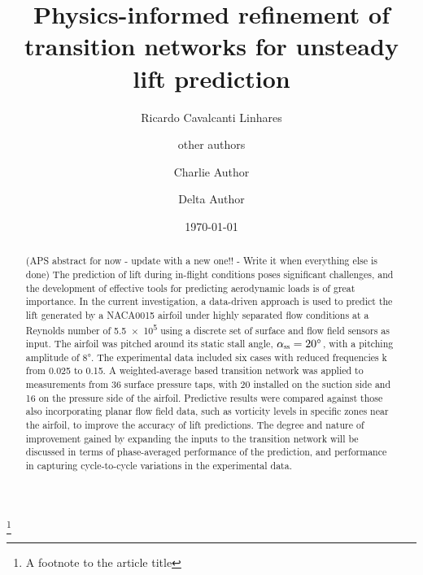 \documentclass[%
 reprint,
 amsmath,amssymb,
 aps,
]{revtex4-2}
\newcommand{\kindex}[2]{\ensuremath{{#1}_{\scalebox{0.65}{#2}}}}
\begin{document}

\title{Physics-informed refinement of transition networks for unsteady lift prediction}%
\thanks{A footnote to the article title}%

\author{Ricardo Cavalcanti Linhares}
\author{other authors}%
%


\author{Charlie Author}
%
%
\author{Delta Author}
%


\date{\today}%

\begin{abstract}
(APS abstract for now - update with a new one!! - Write it when everything else is done)
The prediction of lift during in-flight conditions poses significant challenges, and the development of effective tools for predicting aerodynamic loads is of great importance. 
In the current investigation, a data-driven approach is used to predict the lift generated by a NACA0015 airfoil under highly separated flow conditions at a Reynolds number of \num{5.5e5} using a discrete set of surface and flow field sensors as input. 
The airfoil was pitched around its static stall angle,  $\kindex{\alpha}{ss} = \ang{20}$, with a pitching amplitude of \ang{8}. 
The experimental data included six cases with reduced frequencies k from 0.025 to 0.15. 
A weighted-average based transition network was applied to measurements from 36 surface pressure taps, with 20 installed on the suction side and 16 on the pressure side of the airfoil. 
Predictive results were compared against those also incorporating planar flow field data, such as vorticity levels in specific zones near the airfoil, to improve the accuracy of lift predictions. 
The degree and nature of improvement gained by expanding the inputs to the transition network will be discussed in terms of phase-averaged performance of the prediction, and performance in capturing cycle-to-cycle variations in the experimental data. 
\end{abstract}
\end{document}
